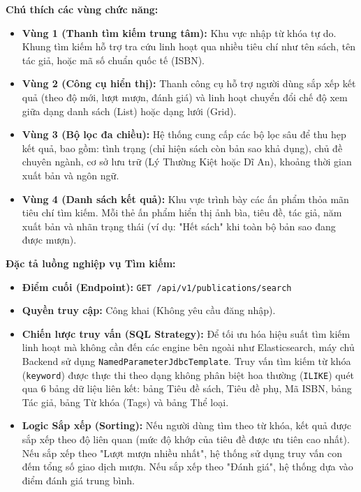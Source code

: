 \noindent\textbf{Chú thích các vùng chức năng:}
\begin{itemize}
    \item \textbf{Vùng 1 (Thanh tìm kiếm trung tâm):} Khu vực nhập từ khóa tự do. Khung tìm kiếm hỗ trợ tra cứu linh hoạt qua nhiều tiêu chí như tên sách, tên tác giả, hoặc mã số chuẩn quốc tế (ISBN).
    \item \textbf{Vùng 2 (Công cụ hiển thị):} Thanh công cụ hỗ trợ người dùng sắp xếp kết quả (theo độ mới, lượt mượn, đánh giá) và linh hoạt chuyển đổi chế độ xem giữa dạng danh sách (List) hoặc dạng lưới (Grid).
    \item \textbf{Vùng 3 (Bộ lọc đa chiều):} Hệ thống cung cấp các bộ lọc sâu để thu hẹp kết quả, bao gồm: tình trạng (chỉ hiện sách còn bản sao khả dụng), chủ đề chuyên ngành, cơ sở lưu trữ (Lý Thường Kiệt hoặc Dĩ An), khoảng thời gian xuất bản và ngôn ngữ.
    \item \textbf{Vùng 4 (Danh sách kết quả):} Khu vực trình bày các ấn phẩm thỏa mãn tiêu chí tìm kiếm. Mỗi thẻ ấn phẩm hiển thị ảnh bìa, tiêu đề, tác giả, năm xuất bản và nhãn trạng thái (ví dụ: "Hết sách" khi toàn bộ bản sao đang được mượn).
\end{itemize}

\vspace{0.5cm}
\noindent\textbf{Đặc tả luồng nghiệp vụ Tìm kiếm:}
\begin{itemize}
    \item \textbf{Điểm cuối (Endpoint):} \texttt{GET /api/v1/publications/search}
    \item \textbf{Quyền truy cập:} Công khai (Không yêu cầu đăng nhập).
    \item \textbf{Chiến lược truy vấn (SQL Strategy):} Để tối ưu hóa hiệu suất tìm kiếm linh hoạt mà không cần đến các engine bên ngoài như Elasticsearch, máy chủ Backend sử dụng \texttt{NamedParameterJdbcTemplate}. Truy vấn tìm kiếm từ khóa (\texttt{keyword}) được thực thi theo dạng không phân biệt hoa thường (\texttt{ILIKE}) quét qua 6 bảng dữ liệu liên kết: bảng Tiêu đề sách, Tiêu đề phụ, Mã ISBN, bảng Tác giả, bảng Từ khóa (Tags) và bảng Thể loại.
    \item \textbf{Logic Sắp xếp (Sorting):} Nếu người dùng tìm theo từ khóa, kết quả được sắp xếp theo độ liên quan (mức độ khớp của tiêu đề được ưu tiên cao nhất). Nếu sắp xếp theo "Lượt mượn nhiều nhất", hệ thống sử dụng truy vấn con đếm tổng số giao dịch mượn. Nếu sắp xếp theo "Đánh giá", hệ thống dựa vào điểm đánh giá trung bình.
\end{itemize}

